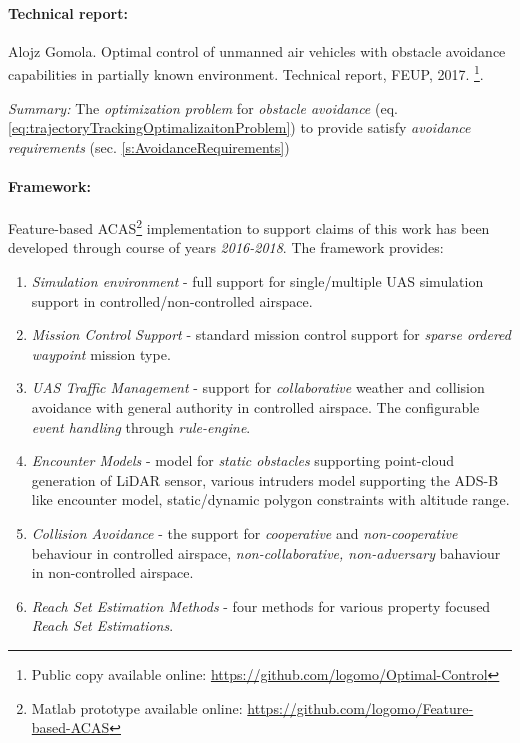 \paragraph{Technical report:} Alojz  Gomola.   Optimal  control  of  unmanned  air  vehicles  with  obstacle  avoidance capabilities in partially known environment.  Technical report, FEUP, 2017. \cite{gomola2017optimal}\footnote{Public copy available online: \url{https://github.com/logomo/Optimal-Control}}.

\emph{Summary:} The \emph{optimization problem} for \emph{obstacle avoidance} (eq. \ref{eq:trajectoryTrackingOptimalizaitonProblem}) to provide satisfy  \emph{avoidance requirements} (sec. \ref{s:AvoidanceRequirements}) 

\paragraph{Framework:} Feature-based ACAS\footnote{Matlab prototype available online: \url{https://github.com/logomo/Feature-based-ACAS}} implementation to support claims of this work has been developed through course of years \emph{2016-2018}. The framework provides: 
\begin{enumerate}
    \item \emph{Simulation environment} - full support for single/multiple UAS simulation support in controlled/non-controlled airspace.
    
    \item \emph{Mission Control Support} - standard mission control support for \emph{sparse ordered waypoint} mission type. 
    
    \item \emph{UAS Traffic Management} - support for \emph{collaborative} weather and collision avoidance with general authority in controlled airspace. The configurable \emph{event handling} through \emph{rule-engine}.
    
    \item \emph{Encounter Models} - model for \emph{static obstacles} supporting point-cloud generation of LiDAR sensor, various intruders model supporting the ADS-B like encounter model, static/dynamic polygon constraints with altitude range. 
    
    \item \emph{Collision Avoidance} - the support for \emph{cooperative} and \emph{non-cooperative} behaviour in controlled airspace, \emph{non-collaborative, non-adversary} bahaviour in non-controlled airspace. 
    
    \item \emph{Reach Set Estimation Methods} - four methods for various property focused \emph{Reach Set Estimations}.
\end{enumerate}